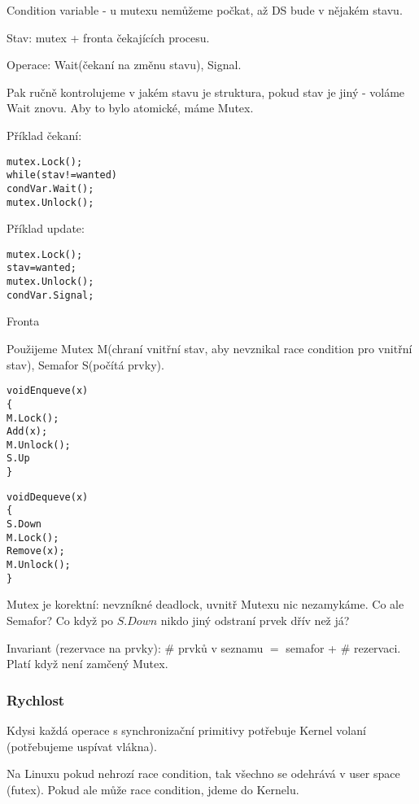 \begin{definition}
	Condition variable - u mutexu nemůžeme počkat, až DS bude v nějakém stavu.

	Stav: mutex + fronta čekajících procesu.

	Operace: Wait(čekaní na změnu stavu), Signal.

	Pak ručně kontrolujeme v jakém stavu je struktura, pokud stav je jiný - voláme Wait znovu.
	Aby to bylo atomické, máme Mutex.

	Příklad čekaní:
	\begin{alltt}
		mutex.Lock();
		while(stav != wanted)
		\tab condVar.Wait();
		mutex.Unlock();
	\end{alltt}

	Příklad update:
	\begin{alltt}
		mutex.Lock();
		stav = wanted;
		mutex.Unlock();
		condVar.Signal;
	\end{alltt}
\end{definition}

\begin{example}
	Fronta

	Použijeme Mutex M(chraní vnitřní stav, aby nevznikal race condition pro vnitřní stav), Semafor S(počítá prvky).

	\begin{alltt}
		void Enqueve(x)
		\{
		\tab M.Lock();
		\tab Add(x);
		\tab M.Unlock();
		\tab S.Up
		\}
	\end{alltt}

	\begin{alltt}
		void Dequeve(x)
		\{
		\tab S.Down
		\tab M.Lock();
		\tab Remove(x);
		\tab M.Unlock();
		\}
	\end{alltt}

	Mutex je korektní: nevzníkné deadlock, uvnitř Mutexu nic nezamykáme.
	Co ale Semafor? Co když po $S.Down$ nikdo jiný odstraní prvek dřív než já?

	Invariant (rezervace na prvky): \# prvků v seznamu $=$ semafor + \# rezervaci.
	Platí když není zamčený Mutex.
\end{example}

\subsubsection{Rychlost}
Kdysi každá operace s synchronizační primitivy potřebuje Kernel volaní (potřebujeme uspívat vlákna).

Na Linuxu pokud nehrozí race condition, tak všechno se odehrává v user space (futex).
Pokud ale může race condition, jdeme do Kernelu.


